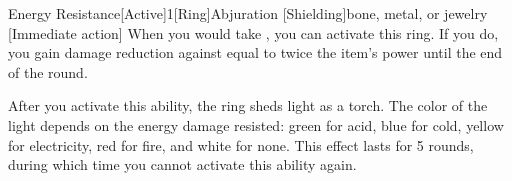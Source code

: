 \begin{comment}
            \begin{dtable}
                \lcaption{Rings}
                \begin{dtabularx}{\columnwidth}{>{\lcol}X l}
                    Ring & Market Price \\
                    \hline
                    Protection \plus1 & 2,000 gp \\
                    Feather falling & 2,200 gp \\
                    Climbing & 2,500 gp \\
                    Jumping & 2,500 gp \\
                    Sustenance & 2,500 gp \\
                    Swimming & 2,500 gp \\
                    Mind shielding & 8,000 gp \\
                    Protection \plus2 & 8,000 gp \\
                    Climbing, improved & 10,000 gp \\
                    Jumping, improved & 10,000 gp \\
                    Swimming, improved & 10,000 gp \\
                    Energy resistance, minor & 12,000 gp \\
                    Protection \plus3 & 18,000 gp \\
                    Energy resistance, major & 28,000 gp \\
                    Protection \plus4 & 32,000 gp \\
                    Energy resistance, greater & 44,000 gp \\
                    Protection \plus5 & 50,000 gp \\
                \end{dtabularx}
            \end{dtable}
\end{comment}

        \begin{magicitemdef}{Energy Resistance}[Active]{1}[Ring]{Abjuration [Shielding]}{bone, metal, or jewelry}
            [Immediate action] When you would take , you can activate this ring.
            If you do, you gain damage reduction against  equal to twice the item's power until the end of the round.

            After you activate this ability, the ring sheds light as a torch.
            The color of the light depends on the energy damage resisted: green for acid, blue for cold, yellow for electricity, red for fire, and white for none.
            This effect lasts for 5 rounds, during which time you cannot activate this ability again.
        \end{magicitemdef}

